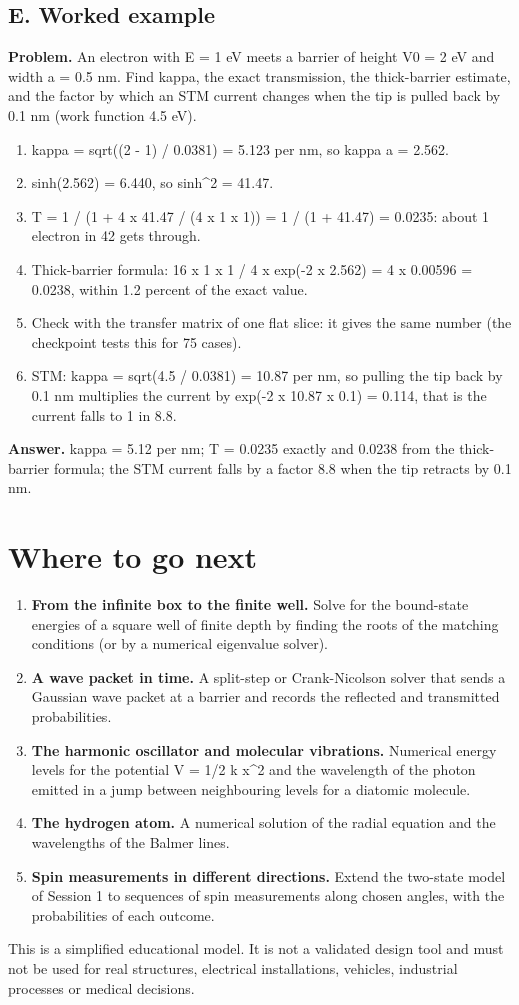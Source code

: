 \documentclass[11pt,a4paper]{article}
\begin{document}
\subsection*{E. Worked example}
\textbf{Problem.} An electron with E = 1 eV meets a barrier of height V0 = 2 eV and width a = 0.5 nm. Find kappa, the exact transmission, the thick-barrier estimate, and the factor by which an STM current changes when the tip is pulled back by 0.1 nm (work function 4.5 eV).

\begin{enumerate}[nosep]
\item kappa = sqrt((2 - 1) / 0.0381) = 5.123 per nm, so kappa a = 2.562.
\item sinh(2.562) = 6.440, so sinh\textasciicircum{}2 = 41.47.
\item T = 1 / (1 + 4 x 41.47 / (4 x 1 x 1)) = 1 / (1 + 41.47) = 0.0235: about 1 electron in 42 gets through.
\item Thick-barrier formula: 16 x 1 x 1 / 4 x exp(-2 x 2.562) = 4 x 0.00596 = 0.0238, within 1.2 percent of the exact value.
\item Check with the transfer matrix of one flat slice: it gives the same number (the checkpoint tests this for 75 cases).
\item STM: kappa = sqrt(4.5 / 0.0381) = 10.87 per nm, so pulling the tip back by 0.1 nm multiplies the current by exp(-2 x 10.87 x 0.1) = 0.114, that is the current falls to 1 in 8.8.
\end{enumerate}
\textbf{Answer.} kappa = 5.12 per nm; T = 0.0235 exactly and 0.0238 from the thick-barrier formula; the STM current falls by a factor 8.8 when the tip retracts by 0.1 nm.

\section*{Where to go next}
\begin{enumerate}[nosep]
\item \textbf{From the infinite box to the finite well.} Solve for the bound-state energies of a square well of finite depth by finding the roots of the matching conditions (or by a numerical eigenvalue solver).
\item \textbf{A wave packet in time.} A split-step or Crank-Nicolson solver that sends a Gaussian wave packet at a barrier and records the reflected and transmitted probabilities.
\item \textbf{The harmonic oscillator and molecular vibrations.} Numerical energy levels for the potential V = 1/2 k x\textasciicircum{}2 and the wavelength of the photon emitted in a jump between neighbouring levels for a diatomic molecule.
\item \textbf{The hydrogen atom.} A numerical solution of the radial equation and the wavelengths of the Balmer lines.
\item \textbf{Spin measurements in different directions.} Extend the two-state model of Session 1 to sequences of spin measurements along chosen angles, with the probabilities of each outcome.
\end{enumerate}

This is a simplified educational model. It is not a validated design tool and must not be used for real structures, electrical installations, vehicles, industrial processes or medical decisions.
\end{document}

